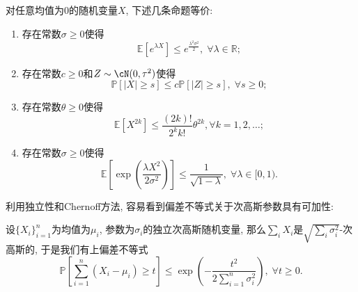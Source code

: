 \begin{theorem}[次高斯随机变量的等价定义]
	对任意均值为$0$的随机变量$X$, 下述几条命题等价: 
	\begin{enumerate}[label=(\Roman*)]
		\item 存在常数$\sigma \geq 0$使得
			\begin{equation*}
				\mathbb{E}[e^{\lambda X} ] \leq e^{\frac{\lambda^2 \sigma^2}{2}},\; \forall \lambda \in \mathbb{R}; 
			\end{equation*}
		\item 存在常数$c \geq 0$和$Z \sim \cN(0, \tau^2)$使得
			\begin{equation*}
				\mathbb{P}[|X| \geq s] \leq c \mathbb{P}[|Z| \geq s],\; \forall s \geq 0; 
			\end{equation*}
		\item 存在常数$\theta \geq 0$使得
			\begin{equation*}
				\mathbb{E}[X^{2k}] \leq \frac{(2k)!}{2^k k!} \theta^{2k}, \forall k = 1,2,\dots;
			\end{equation*}
		\item 存在常数$\sigma \geq 0$使得
			\begin{equation*}
				\mathbb{E}\left[ \exp\left(\frac{\lambda X^2}{2 \sigma^2}\right) \right] \leq \frac{1}{\sqrt{1 - \lambda}},\; \forall \lambda \in [0,1).
			\end{equation*}
	\end{enumerate}
\end{theorem}

利用独立性和Chernoff方法, 容易看到偏差不等式关于次高斯参数具有可加性: 
\begin{proposition}[Hoeffding界]\label{thm:HoeffdingBd}
	设$\{X_i\}_{i=1}^n$为均值为$\mu_i$, 参数为$\sigma_i$的独立次高斯随机变量, 那么$\sum_i X_i$是$\sqrt{\sum_i \sigma_i^2}$-次高斯的, 于是我们有上偏差不等式
	\begin{equation*}
		\mathbb{P} \left[ \sum_{i=1}^n (X_i - \mu_i) \geq t \right]
		\leq \exp \left( - \frac{t^2}{2 \sum_{i=1}^n \sigma_i^2} \right ),\; 
		\forall t \geq 0.
	\end{equation*}
\end{proposition}

